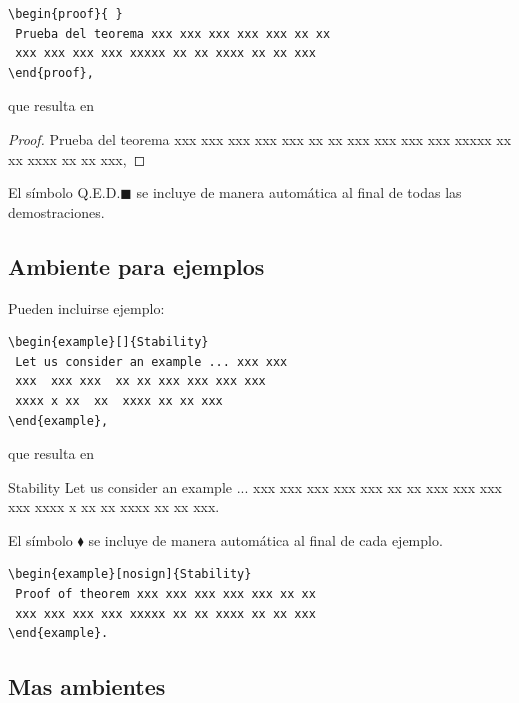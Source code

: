 \documentclass{siep}
\begin{document}
{\small \begin{verbatim}
\begin{proof}{ }
 Prueba del teorema xxx xxx xxx xxx xxx xx xx
 xxx xxx xxx xxx xxxxx xx xx xxxx xx xx xxx
\end{proof},
\end{verbatim}}

\noindent que resulta en

\begin{proof}{ }
 Prueba del teorema xxx xxx xxx xxx xxx xx xx
 xxx xxx xxx xxx xxxxx xx xx xxxx xx xx xxx,
\end{proof}

\medskip

El s\'imbolo Q.E.D.{\footnotesize $\blacksquare$} se incluye de manera autom\'atica al final de todas las demostraciones.

\subsection{Ambiente para ejemplos}
Pueden incluirse ejemplo:

{\small \begin{verbatim}
\begin{example}[]{Stability}
 Let us consider an example ... xxx xxx
 xxx  xxx xxx  xx xx xxx xxx xxx xxx
 xxxx x xx  xx  xxxx xx xx xxx
\end{example},
\end{verbatim}}

\noindent que resulta en

\begin{example}[]{Stability}
 Let us consider an example ... xxx xxx
 xxx xxx xxx  xx xx xxx xxx xxx xxx xxxx
 x xx xx  xxxx xx xx xxx.
\end{example}

\medskip \noindent El s\'imbolo $\blacklozenge$ se incluye de manera autom\'atica al final de cada ejemplo.

{\small \begin{verbatim}
\begin{example}[nosign]{Stability}
 Proof of theorem xxx xxx xxx xxx xxx xx xx
 xxx xxx xxx xxx xxxxx xx xx xxxx xx xx xxx
\end{example}.
\end{verbatim}}

\subsection{Mas ambientes}
\end{document}
